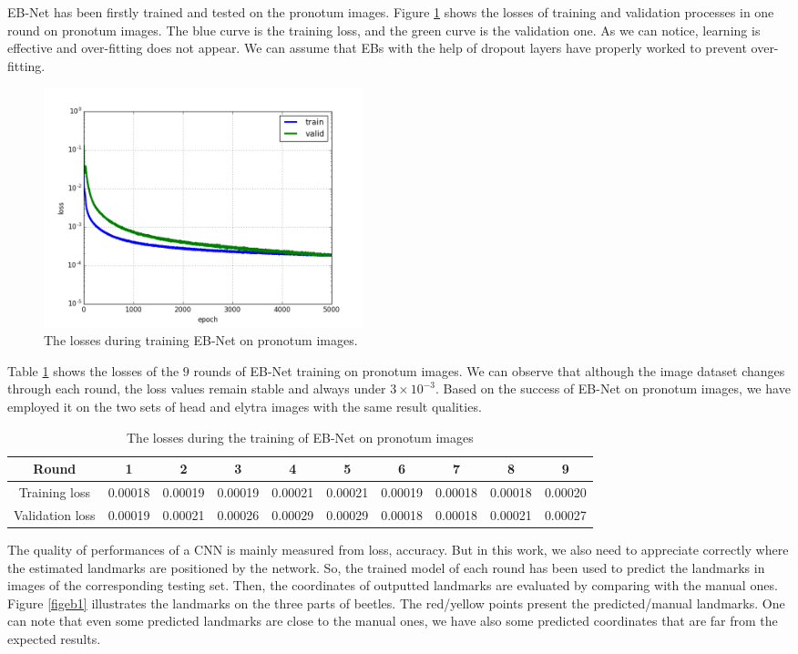 \documentclass[review]{elsarticle}
\begin{document}
EB-Net has been firstly trained and tested on the pronotum images. Figure \ref{figdlosses} shows the losses of training and validation processes in one round on pronotum images. The blue curve is the training loss, and the green curve is the validation one. As we can notice, learning is effective and over-fitting does not appear. We can assume that EBs with the help of dropout layers have properly worked to prevent over-fitting.

\begin{figure}[h!]
    \centering
	\includegraphics[width=0.45\textwidth]{./images/loss_v16}
    \caption{The losses during training EB-Net on pronotum images.}
    \label{figdlosses}
\end{figure}

Table \ref{tbltrainingloss} shows the losses of the $9$ rounds of EB-Net training on pronotum images. We can observe that although the image dataset changes through each round, the loss values remain stable and always under $3 \times 10^{-3}$. Based on the success of EB-Net on pronotum images, we have employed it on the two sets of head and elytra images with the same result qualities.

\begin{table}[h!]
	\centering
	\begin{tabular}{| c | c | c | c | c | c | c | c | c | c |}
	\hline
	Round & 1 & 2 & 3 & 4 & 5 & 6 & 7 & 8 & 9 \\ \hline
Training loss & 0.00018 & 0.00019 & 0.00019 & 0.00021 & 0.00021 & 0.00019 & 0.00018 & 0.00018 & 0.00020 \\ \hline
Validation loss & 0.00019 & 0.00021 & 0.00026 & 0.00029 & 0.00029 & 0.00018 & 0.00018 & 0.00021 & 0.00027 \\ \hline
	\end{tabular}
	\caption{The losses during the training of EB-Net on pronotum images}
	\label{tbltrainingloss}
\end{table}

The quality of performances of a CNN is mainly measured from loss, accuracy. But in this work, we also need to appreciate correctly where the estimated landmarks are positioned by the network. So, the trained model of each round has been used to predict the landmarks in images of the corresponding testing set. Then, the coordinates of outputted landmarks are evaluated by comparing with the manual ones. Figure \ref{figeb1} illustrates the landmarks on the three parts of beetles. The red/yellow points present the predicted/manual landmarks. One can note that even some predicted landmarks are close to the manual ones, we have also some predicted coordinates that are far from the expected results.
\end{document}
